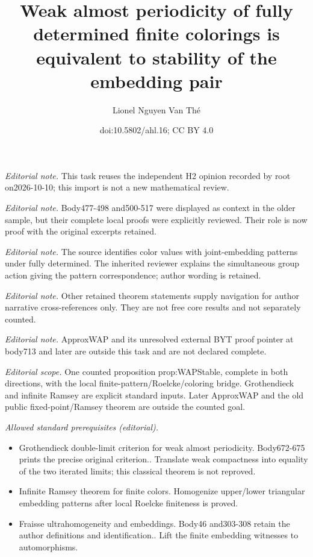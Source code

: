 \documentclass[11pt]{article}
\title{Weak almost periodicity of fully determined finite colorings is equivalent to stability of the embedding pair}
\author{Lionel Nguyen Van Thé}
\date{doi:10.5802/ahl.16; CC BY 4.0}
\theoremstyle{definition}
\numberwithin{equation}{section}
\numberwithin{figure}{section}
\numberwithin{table}{section}
\begin{document}
\maketitle
\noindent\textit{Editorial note.} This task reuses the independent H2 opinion recorded by root on2026-10-10; this import is not a new mathematical review.\par\medskip
\noindent\textit{Editorial note.} Body477-498 and500-517 were displayed as context in the older sample, but their complete local proofs were explicitly reviewed. Their role is now proof with the original excerpts retained.\par\medskip
\noindent\textit{Editorial note.} The source identifies color values with joint-embedding patterns under fully determined. The inherited reviewer explains the simultaneous group action giving the pattern correspondence; author wording is retained.\par\medskip
\noindent\textit{Editorial note.} Other retained theorem statements supply navigation for author narrative cross-references only. They are not free core results and not separately counted.\par\medskip
\noindent\textit{Editorial note.} ApproxWAP and its unresolved external BYT proof pointer at body713 and later are outside this task and are not declared complete.\par\medskip
\noindent\textit{Editorial scope.} One counted proposition prop:WAPStable, complete in both directions, with the local finite-pattern/Roelcke/coloring bridge. Grothendieck and infinite Ramsey are explicit standard inputs. Later ApproxWAP and the old public fixed-point/Ramsey theorem are outside the counted goal.\par\medskip
\noindent\textit{Allowed standard prerequisites (editorial).}\begin{itemize}
\item Grothendieck double-limit criterion for weak almost periodicity. Body672-675 prints the precise original criterion.. Translate weak compactness into equality of the two iterated limits; this classical theorem is not reproved.
\item Infinite Ramsey theorem for finite colors. Homogenize upper/lower triangular embedding patterns after local Roelcke finiteness is proved.
\item Fraisse ultrahomogeneity and embeddings. Body46 and303-308 retain the author definitions and identification.. Lift the finite embedding witnesses to automorphisms.
\end{itemize}\medskip
\end{document}
